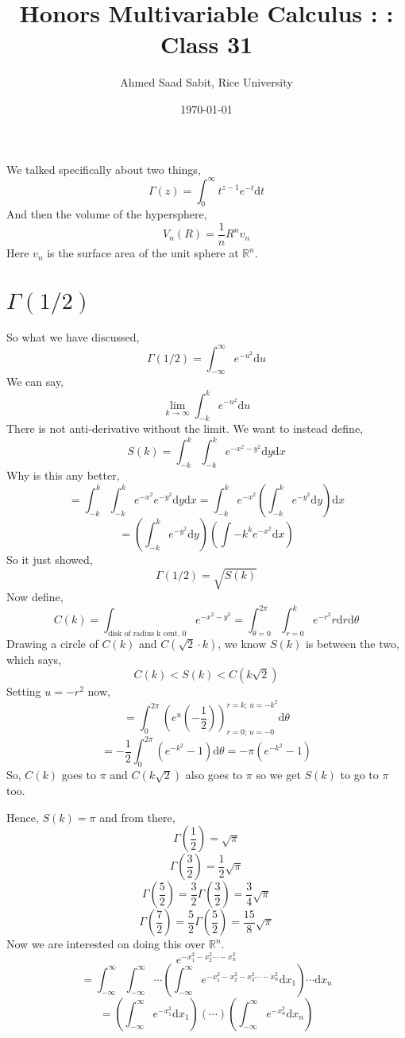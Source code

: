 \documentclass[letter]{article}
\title{Honors Multivariable Calculus : : Class 31}
\author{Ahmed Saad Sabit, Rice University}
\date{\today}
\begin{document}
\maketitle
We talked specifically about two things, 
\[
\Gamma(z) = \int_{0}^{\infty}  t ^{z - 1} e^{ -t} \mathrm{d} t 
\]
And then the volume of the hypersphere, 
\[
V_n (R) = \frac{1}{n}R^{n} v_n
\]
Here $v_n$ is the surface area of the unit sphere at $\mathbb{R}^{n}$. 

\section*{$\Gamma(1 / 2)$} 
So what we have discussed, 
\[
\Gamma(1 / 2) = \int_{-\infty}^{\infty} e ^{- u^2} \mathrm{d}  u 
\] 
We can say, 
\[
\lim_{k \to \infty} \int_{-k}^{k} e ^{- u ^2} \mathrm{d} u 
\]
There is not anti-derivative without the limit. We want to instead define, 
\[
S(k) = \int_{-k}^{k} \int_{-k}^{k} e ^{-x^2 -y^2} \mathrm{d} y \mathrm{d} x  
\]
Why is this any better, 
\[
= \int_{-k}^{k} \int_{-k}^{k} e ^{-x^2 }e ^{-y^2 } \mathrm{d} y \mathrm{d} x  
= \int_{-k}^{k} e ^{-x^2} \left(\int_{-k}^{k} e ^{-y^2 } \mathrm{d} y \right) \mathrm{d} x  
\]
\[
= \left(
\int_{-k}^{k} e^{-y^2} \mathrm{d} y 
\right)
\left(\int{-k}^{k} e ^{-x^2 }\mathrm{d} x \right) 
\]
So it just showed, \[
\Gamma({1} / {2} ) = \sqrt{S(k)} 
\] 
Now define, 
\[
C(k) = \int_{\text{disk of radius k cent. 0}} e ^{-x^2 - y^2} = \int_{\theta = 0}^{2 \pi } \int_{r = 0}^{k}  e ^{-r^2} r \mathrm{d} r \mathrm{d} \theta  
\]
Drawing a circle of $C(k)$ and $C(\sqrt{2 }  \cdot  k)$, we know $S(k)$ is between the two, which says, 
\[
C(k) < S(k) < C(k \sqrt{2} )
\] 
Setting $u = -r ^2$ now, 
\[
= \int_{0}^{ 2\pi } \left(
e ^{u} \left(- \frac{1}{2}\right)
\right) _{r = 0; \, u = -0} ^{r = k; \, u =-k ^2} \mathrm{d} \theta 
\]
\[
= - \frac{1}{2} \int_{0}^{2 \pi } \left(e ^{-k^2 } - 1\right)\mathrm{d} \theta = - \pi \left(e ^{ - k^2 } - 1\right) 
\] 
So, $C(k)$ goes to $ \pi $ and $C(k \sqrt{2} )$ also goes to $\pi $ so we get $S(k) $ to go to $\pi $ too. 

Hence, $S(k) = \pi $ and from there, 
\[
\Gamma \left(\frac{1}{2}\right) = \sqrt{\pi } 
\]
\[
\Gamma \left(\frac{3}{2}\right) = \frac{1}{2}\sqrt{\pi } 
\] 
\[
\Gamma \left(\frac{5}{2}\right) = \frac{3}{2} \Gamma\left(\frac{3}{2}\right) = \frac{3}{4} \sqrt{\pi } 
\]
\[
\Gamma \left(\frac{7}{2}\right) = \frac{5}{2} \Gamma\left(\frac{5}{2 }\right) = \frac{15}{8} \sqrt{\pi } 
\]
Now we are interested on doing this over $\mathbb{R}^{n}$. 
\[
e ^{-x_1^2 - x_2^2 \cdots -x_n^2}
\]
\[
= \int_{-\infty}^{\infty} \int_{-\infty}^{\infty}  \cdots 
\left(
\int_{-\infty}^{\infty} e ^{-x_1^2 - x_2^2 - x_3^2 \cdots -x_n^2} \mathrm{d} x_1 
\right) \cdots \mathrm{d} x_n
\]
\[ = 
	\left(\int_{-\infty}^{\infty} e^{-x_1^2} \mathrm{d} x_1 \right) \left(\cdots \right) 
\left(	\int_{-\infty}^{\infty} e ^{-x_n^2 } \mathrm{d} x_n   \right) 
\]
\end{document}

